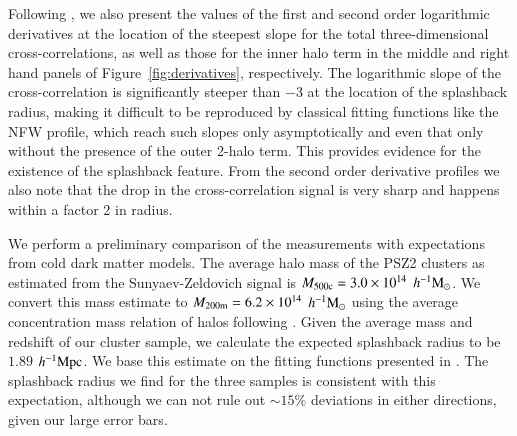 \documentclass[iop, apjl, twocolappendix, numberedappendix]{emulateapj}
\def\mpch{h^{-1}{\rm Mpc}}
\def\msunh{h^{-1}{\rm M_{\odot}}}
\begin{document}
Following \citet{baxter2017halo}, we also present the values of the
first and second order logarithmic derivatives at the location of the steepest slope for
the total three-dimensional cross-correlations, as well as those for
the inner halo term in the middle and right hand panels of
Figure~\ref{fig:derivatives}, respectively. The logarithmic slope of the 
cross-correlation is significantly steeper than $-3$ at the location 
of the splashback radius, making it difficult to
be reproduced by classical fitting functions like the NFW profile,
which reach such slopes only asymptotically and even that only
without the presence of the outer 2-halo term. This provides
evidence for the existence of the splashback feature. From the second
order derivative profiles we also note that the drop in the cross-correlation
signal is very sharp and happens within a factor 2 in radius.

We perform a preliminary comparison of the measurements with
expectations from cold dark matter models. The average halo mass of
the PSZ2 clusters as estimated from the Sunyaev-Zeldovich signal
is $M_{\rm 500c}=3.0\times10^{14}$ $\msunh$. We convert this mass
estimate to $M_{\rm 200m}=6.2\times10^{14}$ $\msunh$ using the average
concentration mass relation of halos following
\citet{HuKravtsov:2003}. Given the average mass and redshift of our
cluster sample, we calculate the expected splashback radius to be
$1.89$ $\mpch$. We base this estimate on the fitting functions
presented in \citet{more2015splashback}. The splashback radius we
find for the three samples is consistent with this expectation,
although we can not rule out $\sim 15\%$ deviations in either directions,
given our large error bars.
\end{document}
